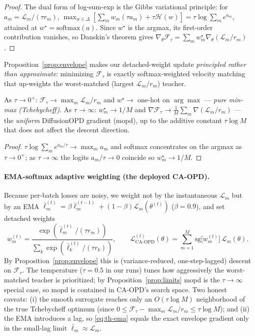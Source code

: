 \begin{proof}
The dual form of log-sum-exp is the Gibbs variational principle: for
$a_m=\mathcal L_m/(\tau r_m)$, $\max_{w\in\Delta}[\sum_m w_m(\tau a_m)+\tau\mathcal H(w)]
=\tau\log\sum_m e^{a_m}$, attained at $w^\star=\mathrm{softmax}(a)$. Since $w^\star$ is
the argmax, its first-order contribution vanishes, so Danskin's theorem gives
$\nabla_\theta\mathcal F_\tau=\sum_m w_m^\star\nabla_\theta(\mathcal L_m/r_m)$.
\end{proof}

Proposition~\ref{prop:envelope} makes our detached-weight update \emph{principled rather
than approximate}: minimizing $\mathcal F_\tau$ is exactly softmax-weighted velocity
matching that up-weights the worst-matched (largest $\mathcal L_m/r_m$) teacher.

\begin{proposition}
\label{prop:limits}
As $\tau\to0^+$: $\mathcal F_\tau\to\max_m\mathcal L_m/r_m$ and $w^\star\to$ one-hot on
$\arg\max$ --- \emph{pure min-max (Tchebycheff)}. As $\tau\to\infty$: $w_m^\star\to1/M$
and $\nabla\mathcal F_\tau\to\tfrac1M\sum_m\nabla(\mathcal L_m/r_m)$ --- the
\emph{uniform} DiffusionOPD gradient (mopd), up to the additive constant $\tau\log M$
that does not affect the descent direction.
\end{proposition}

\begin{proof}
$\tau\log\sum_m e^{a_m/\tau}\to\max_m a_m$ and softmax concentrates on the argmax as
$\tau\to0^+$; as $\tau\to\infty$ the logits $a_m/\tau\to0$ coincide so $w_m^\star\to1/M$.
\end{proof}

\paragraph{EMA-softmax adaptive weighting (the deployed CA-OPD).}
Because per-batch losses are noisy, we weight not by the instantaneous $\mathcal L_m$ but
by an EMA $\bar\ell_m^{(t)}=\beta\bar\ell_m^{(t-1)}+(1-\beta)\mathcal L_m(\theta^{(t)})$
($\beta{=}0.9$), and set detached weights
\begin{equation}
\label{eq:th-ema}
w_m^{(t)}=\frac{\exp(\bar\ell_m^{(t)}/(\tau r_m))}{\sum_k\exp(\bar\ell_k^{(t)}/(\tau r_k))},
\qquad
\mathcal L_{\mathrm{CA\text{-}OPD}}^{(t)}(\theta)=\sum_{m=1}^M \mathrm{sg}\!\bigl[w_m^{(t)}\bigr]\,\mathcal L_m(\theta).
\end{equation}
By Proposition~\ref{prop:envelope} this is (variance-reduced, one-step-lagged) descent on
$\mathcal F_\tau$. The temperature ($\tau{=}0.5$ in our runs) tunes how aggressively the
worst-matched teacher is prioritized; by Proposition~\ref{prop:limits} mopd is the
$\tau\to\infty$ special case, so mopd is contained in CA-OPD's search space. Two honest
caveats: (i) the smooth surrogate reaches only an $O(\tau\log M)$ neighborhood of the
true Tchebycheff optimum (since $0\le\mathcal F_\tau-\max_m\mathcal L_m/r_m\le\tau\log M$);
and (ii) the EMA introduces a lag, so \eqref{eq:th-ema} equals the exact
envelope gradient only in the small-lag limit $\bar\ell_m\approx\mathcal L_m$.


